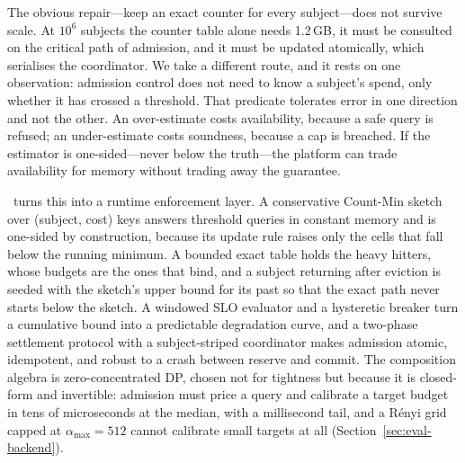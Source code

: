 The obvious repair---keep an exact counter for every subject---does not survive
scale. At $10^6$ subjects the counter table alone needs 1.2\,GB, it must be
consulted on the critical path of admission, and it must be updated atomically,
which serialises the coordinator. We take a different route, and it rests on one
observation: admission control does not need to know a subject's spend, only
whether it has crossed a threshold. That predicate tolerates error in one
direction and not the other. An over-estimate costs availability, because a safe
query is refused; an under-estimate costs soundness, because a cap is breached.
If the estimator is one-sided---never below the truth---the platform can trade
availability for memory without trading away the guarantee.

\sys\ turns this into a runtime enforcement layer. A conservative Count-Min
sketch over (subject, cost) keys answers threshold queries in constant memory and
is one-sided by construction, because its update rule raises only the cells that
fall below the running minimum. A bounded exact table holds the heavy hitters,
whose budgets are the ones that bind, and a subject returning after eviction is
seeded with the sketch's upper bound for its past so that the exact path never
starts below the sketch. A windowed SLO evaluator and a hysteretic breaker turn a
cumulative bound into a predictable degradation curve, and a two-phase settlement
protocol with a subject-striped coordinator makes admission atomic, idempotent,
and robust to a crash between reserve and commit. The composition algebra is
zero-concentrated DP, chosen not for tightness but because it is closed-form and
invertible: admission must price a query and calibrate a target budget in tens of
microseconds at the median, with a millisecond tail, and a R\'enyi grid capped at $\alpha_{\max}{=}512$ cannot calibrate small
targets at all (Section~\ref{sec:eval-backend}).

